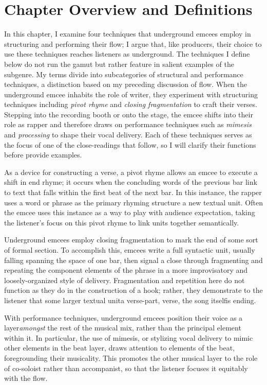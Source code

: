 \section{Chapter Overview and Definitions}

In this chapter, I examine four techniques that underground emcees employ in structuring and
performing their flow; I argue that, like producers, their choice to use these techniques reaches
listeners as underground. The techniques I define below do not run the gamut but rather feature in
salient examples of the subgenre. My terms divide into subcategories of structural and performance
techniques, a distinction based on my preceding discussion of flow. When the underground emcee 
inhabits the role of writer, they experiment with structuring techniques including \emph{pivot rhyme}
and \emph{closing fragmentation} to craft their verses. Stepping into the recording booth or onto 
the stage, the emcee shifts into their role as rapper and therefore draws on performance techniques
such as \emph{mimesis} and \emph{processing} to shape their vocal delivery. Each of these techniques
serves as the focus of one of the close-readings that follow, so I will clarify their functions 
before provide examples.

As a device for constructing a verse, a pivot rhyme allows an emcee to execute a shift in end rhyme;
it occurs when the concluding words of the previous bar link to text that falls within the first beat
of the next bar. In this instance, the rapper uses a word or phrase as the primary rhyming structure
a new textual unit. Often the emcee uses this instance as a way to play with audience expectation, 
taking the listener's focus on this pivot rhyme to link units together semantically.

Underground emcees employ closing fragmentation to mark the end of some sort of formal section. To
accomplish this, emcees write a full syntactic unit, usually falling spanning the space of one bar,
then signal a close through fragmenting and repeating the component elements of the phrase in a more
improvisatory and loosely-organized style of delivery. Fragmentation and repetition here do not 
function as they do in the construction of a hook; rather, they demonstrate to the listener that some
larger textual unit\textemdash a verse-part, verse, the song itself\textemdash is ending.

With performance techniques, underground emcees position their voice as a layer\emph{amongst} the rest
of the musical mix, rather than the principal element within it. In particular, the use of mimesis, or
stylizing vocal delivery to mimic other elements in the beat layer, draws attention to elements of the
beat, foregrounding their musicality. This promotes the other musical layer to the role of co-soloist
rather than accompanist, so that the listener focuses it equitably with the flow.

